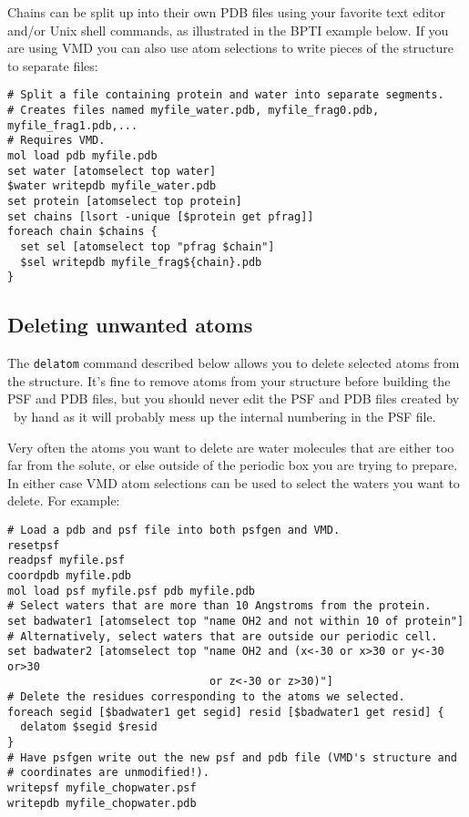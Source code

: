 Chains can be split up into their own PDB files using your favorite text
editor and/or Unix shell commands, as illustrated in the BPTI example below.
If you are using VMD you can also use atom selections to write pieces of
the structure to separate files:

\begin{verbatim}
# Split a file containing protein and water into separate segments.
# Creates files named myfile_water.pdb, myfile_frag0.pdb, myfile_frag1.pdb,...
# Requires VMD.
mol load pdb myfile.pdb
set water [atomselect top water]
$water writepdb myfile_water.pdb
set protein [atomselect top protein]
set chains [lsort -unique [$protein get pfrag]]
foreach chain $chains {
  set sel [atomselect top "pfrag $chain"]
  $sel writepdb myfile_frag${chain}.pdb
}
\end{verbatim}

\subsection{Deleting unwanted atoms}
The {\tt delatom} command described below allows you to delete selected
atoms from the structure.  It's fine to remove atoms from your structure
before building the PSF and PDB files, but you should never edit the PSF
and PDB files created by \PSFGEN\ by hand as it will probably mess up the
internal numbering in the PSF file.  

Very often the atoms you want to delete are water molecules that are
either too far from the solute, or else outside of the periodic box you
are trying to prepare.  In either case VMD atom selections can be used
to select the waters you want to delete.  For example:

\begin{verbatim}
# Load a pdb and psf file into both psfgen and VMD.
resetpsf
readpsf myfile.psf
coordpdb myfile.pdb
mol load psf myfile.psf pdb myfile.pdb
# Select waters that are more than 10 Angstroms from the protein.
set badwater1 [atomselect top "name OH2 and not within 10 of protein"]
# Alternatively, select waters that are outside our periodic cell.
set badwater2 [atomselect top "name OH2 and (x<-30 or x>30 or y<-30 or>30
                               or z<-30 or z>30)"]
# Delete the residues corresponding to the atoms we selected.
foreach segid [$badwater1 get segid] resid [$badwater1 get resid] {
  delatom $segid $resid
}
# Have psfgen write out the new psf and pdb file (VMD's structure and
# coordinates are unmodified!).
writepsf myfile_chopwater.psf
writepdb myfile_chopwater.pdb
\end{verbatim}


